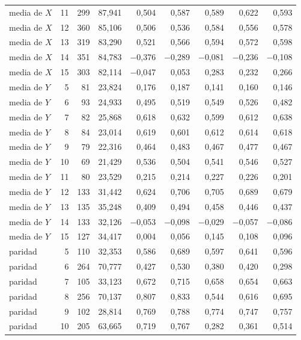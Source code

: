 \begin{table}[htbp]
{\begin{tabular}{@{}lrrrrrrrr@{}}
        media de $X$ & 11 & 299 & 87,941 & 0,504 & 0,587 & 0,589 & 0,622 & 0,593 \\
        media de $X$ & 12 & 360 & 85,106 & 0,506 & 0,536 & 0,584 & 0,556 & 0,578 \\
        media de $X$ & 13 & 319 & 83,290 & 0,521 & 0,566 & 0,594 & 0,572 & 0,598 \\
        media de $X$ & 14 & 351 & 84,783 & $-$0,376 & $-$0,289 & $-$0,081 & $-$0,236 & $-$0,108 \\
        media de $X$ & 15 & 303 & 82,114 & $-$0,047 & 0,053 & 0,283 & 0,232 & 0,266 \\
        media de $Y$ & 5 & 81 & 23,824 & 0,176 & 0,187 & 0,141 & 0,160 & 0,146 \\
        media de $Y$ & 6 & 93 & 24,933 & 0,495 & 0,519 & 0,549 & 0,526 & 0,482 \\
        media de $Y$ & 7 & 82 & 25,868 & 0,618 & 0,632 & 0,599 & 0,612 & 0,638 \\
        media de $Y$ & 8 & 84 & 23,014 & 0,619 & 0,601 & 0,612 & 0,614 & 0,618 \\
        media de $Y$ & 9 & 79 & 22,316 & 0,464 & 0,483 & 0,467 & 0,477 & 0,467 \\
        media de $Y$ & 10 & 69 & 21,429 & 0,536 & 0,504 & 0,541 & 0,546 & 0,527 \\
        media de $Y$ & 11 & 80 & 23,529 & 0,215 & 0,214 & 0,227 & 0,226 & 0,201 \\
        media de $Y$ & 12 & 133 & 31,442 & 0,624 & 0,706 & 0,705 & 0,689 & 0,679 \\
        media de $Y$ & 13 & 135 & 35,248 & 0,409 & 0,494 & 0,458 & 0,446 & 0,437 \\
        media de $Y$ & 14 & 133 & 32,126 & $-$0,053 & $-$0,098 & $-$0,029 & $-$0,057 & $-$0,086 \\
        media de $Y$ & 15 & 127 & 34,417 & 0,004 & 0,056 & 0,145 & 0,108 & 0,096 \\
        paridad & 5 & 110 & 32,353 & 0,586 & 0,689 & 0,597 & 0,641 & 0,596 \\
        paridad & 6 & 264 & 70,777 & 0,427 & 0,530 & 0,380 & 0,420 & 0,298 \\
        paridad & 7 & 105 & 33,123 & 0,672 & 0,715 & 0,658 & 0,654 & 0,663 \\
        paridad & 8 & 256 & 70,137 & 0,807 & 0,833 & 0,544 & 0,616 & 0,695 \\
        paridad & 9 & 102 & 28,814 & 0,769 & 0,788 & 0,774 & 0,747 & 0,757 \\
        paridad & 10 & 205 & 63,665 & 0,719 & 0,767 & 0,282 & 0,361 & 0,514 \\

\end{tabular}}
\end{table}
